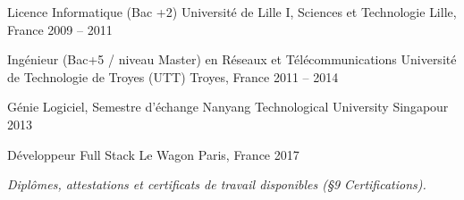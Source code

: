 
\begin{cventries}

  \cventry
    {Licence Informatique (Bac +2)}
    {Université de Lille I, Sciences et Technologie}
    {Lille, France}
    {2009 – 2011}
    {}

  \cventry
    {Ingénieur (Bac+5 / niveau Master) en Réseaux et Télécommunications}
    {Université de Technologie de Troyes (UTT)}
    {Troyes, France}
    {2011 – 2014}
    {}

  \cventry
    {Génie Logiciel, Semestre d'échange}
    {Nanyang Technological University}
    {Singapour}
    {2013}
    {}

  \cventry
    {Développeur Full Stack}
    {Le Wagon}
    {Paris, France}
    {2017}
    {}

\end{cventries}

\begin{cvparagraph}
\textit{Diplômes, attestations et certificats de travail disponibles (§9 Certifications).}
\end{cvparagraph}
